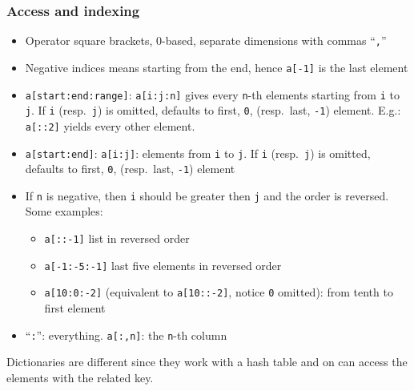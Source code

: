 \documentclass[a4paper,12pt,%
              final%
              ]{article}
\begin{document}
\subsubsection{Access and indexing}
\begin{itemize}
  \item Operator square brackets, 0-based, separate dimensions with commas ``\texttt{,}''
  \item Negative indices means starting from the end, hence \texttt{a[-1]} is the last element
  \item \verb|a[start:end:range]|: \verb|a[i:j:n]| gives every \texttt{n}-th elements starting from \texttt{i} to \texttt{j}. If \texttt{i} (resp.~\texttt{j}) is omitted, defaults to first, \texttt{0}, (resp.~last, \texttt{-1}) element. E.g.: \verb|a[::2]| yields every other element.
  \item \verb|a[start:end]|: \verb|a[i:j]|: elements from \texttt{i} to \texttt{j}. If \texttt{i} (resp.~\texttt{j}) is omitted, defaults to first, \texttt{0}, (resp.~last, \texttt{-1}) element
  \item If \texttt{n} is negative, then \texttt{i} should be greater then \texttt{j} and the order is reversed. Some examples:
    \begin{itemize}
      \item \verb|a[::-1]| list in reversed order
      \item \verb|a[-1:-5:-1]| last five elements in reversed order
      \item \verb|a[10:0:-2]| (equivalent to \verb|a[10::-2]|, notice \texttt{0} omitted): from tenth to first element
    \end{itemize}
  \item ``\verb|:|'': everything. \verb|a[:,n]|: the \texttt{n}-th column
\end{itemize}

Dictionaries are different since they work with a hash table and on can access the elements with the related key.
\end{document}
